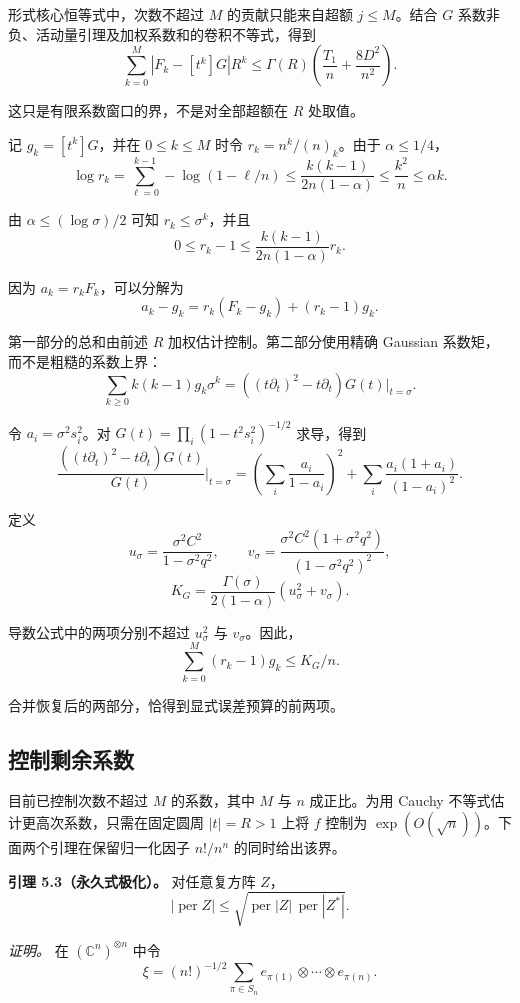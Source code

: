 \documentclass[11pt,a4paper]{article}
\makeatletter
\newcommand{\paperstatement}[3]{\par\addvspace{6pt}\Needspace{4\baselineskip}\phantomsection\def\@currentlabel{#2}\label{#3}\noindent\textbf{#1}\enspace}
\makeatother
\begin{document}
形式核心恒等式中，次数不超过 \(M\) 的贡献只能来自超额 \(j\le M\)。结合 \(G\) 系数非负、活动量引理及加权系数和的卷积不等式，得到
\[\sum_{k=0}^{M}|F_k-[t^k]G|R^k
\le\Gamma(R)\left(\frac{T_1}n+\frac{8D^2}{n^2}\right).\]

这只是有限系数窗口的界，不是对全部超额在 \(R\) 处取值。

记 \(g_k=[t^k]G\)，并在 \(0\le k\le M\) 时令 \(r_k=n^k/(n)_k\)。由于 \(\alpha\le1/4\)，
\[\log r_k
=\sum_{\ell=0}^{k-1}-\log(1-\ell/n)
\le\frac{k(k-1)}{2n(1-\alpha)}
\le\frac{k^2}n
\le\alpha k.\]

由 \(\alpha\le(\log\sigma)/2\) 可知 \(r_k\le\sigma^k\)，并且
\[0\le r_k-1
\le\frac{k(k-1)}{2n(1-\alpha)}r_k.\]

因为 \(a_k=r_kF_k\)，可以分解为
\[a_k-g_k=r_k(F_k-g_k)+(r_k-1)g_k.\]

第一部分的总和由前述 \(R\) 加权估计控制。第二部分使用精确 Gaussian 系数矩，而不是粗糙的系数上界：
\[\sum_{k\ge0}k(k-1)g_k\sigma^k
=\left((t\partial_t)^2-t\partial_t\right)G(t)\big|_{t=\sigma}.\]

令 \(a_i=\sigma^2s_i^2\)。对 \(G(t)=\prod_i(1-t^2s_i^2)^{-1/2}\) 求导，得到
\[\frac{\left((t\partial_t)^2-t\partial_t\right)G(t)}{G(t)}
\bigg|_{t=\sigma}
=\left(\sum_i\frac{a_i}{1-a_i}\right)^2
+\sum_i\frac{a_i(1+a_i)}{(1-a_i)^2}.\]

定义
\[u_\sigma=\frac{\sigma^2C^2}{1-\sigma^2q^2},
\qquad
v_\sigma=\frac{\sigma^2C^2(1+\sigma^2q^2)}
{(1-\sigma^2q^2)^2},\]
\nopagebreak[3]\[K_G=\frac{\Gamma(\sigma)}{2(1-\alpha)}
\left(u_\sigma^2+v_\sigma\right).\]

导数公式中的两项分别不超过 \(u_\sigma^2\) 与 \(v_\sigma\)。因此，
\[\sum_{k=0}^{M}(r_k-1)g_k\le K_G/n.\]

合并恢复后的两部分，恰得到显式误差预算的前两项。

\subsection{控制剩余系数}\label{sec-5.5}

目前已控制次数不超过 \(M\) 的系数，其中 \(M\) 与 \(n\) 成正比。为用 Cauchy 不等式估计更高次系数，只需在固定圆周 \(|t|=R>1\) 上将 \(f\) 控制为 \(\exp(O(\sqrt n))\)。下面两个引理在保留归一化因子 \(n!/n^n\) 的同时给出该界。

\paperstatement{引理 5.3（永久式极化）。}{5.3}{thm-5.3} 对任意复方阵 \(Z\)，
\[|\operatorname{per}Z|
\le\sqrt{\operatorname{per}|Z|\,
\operatorname{per}|Z^*|}.\]

\emph{证明。} 在 \((\mathbb C^n)^{\otimes n}\) 中令
\[\xi=(n!)^{-1/2}
\sum_{\pi\in S_n}
e_{\pi(1)}\otimes\cdots\otimes e_{\pi(n)}.\]
\end{document}

